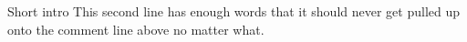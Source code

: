 Short intro %
This second line has enough words that
it should never get pulled up onto the
comment line above no matter what.
